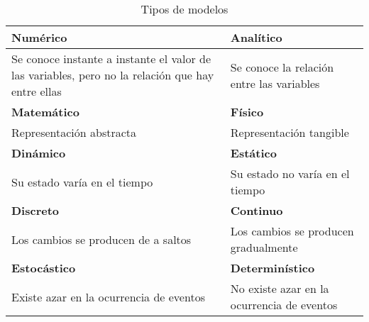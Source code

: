 \documentclass[12pt, a4paper, twoside]{paquetes-apunte/apunte}
\providecommand{\tabularnewline}{\\}
\begin{document}





\begin{table}[h]
  \centering
  \begin{tabular}{ | >{\centering}p{} | >{\centering}p{} | }
    \hline
    \textbf{Numérico} & \textbf{Analítico} \tabularnewline
    \hline
    Se conoce instante a instante el valor de las variables, pero no la
    relación que hay entre ellas & Se conoce la relación entre las variables \tabularnewline
    \hline
    \hline
    \textbf{Matemático} & \textbf{Físico} \tabularnewline
    \hline
    Representación abstracta & Representación tangible \tabularnewline
    \hline
    \hline
    \textbf{Dinámico} & \textbf{Estático} \tabularnewline
    \hline
    Su estado varía en el tiempo & Su estado no varía en el tiempo \tabularnewline
    \hline
    \hline
    \textbf{Discreto} & \textbf{Continuo} \tabularnewline
    \hline
    Los cambios se producen de a saltos & Los cambios se producen gradualmente \tabularnewline
    \hline
    \hline
    \textbf{Estocástico} & \textbf{Determinístico} \tabularnewline
    \hline
    Existe azar en la ocurrencia de eventos & No existe azar en la ocurrencia de eventos \tabularnewline
    \hline
  \end{tabular}
  \caption{Tipos de modelos}
\end{table}
\end{document}
